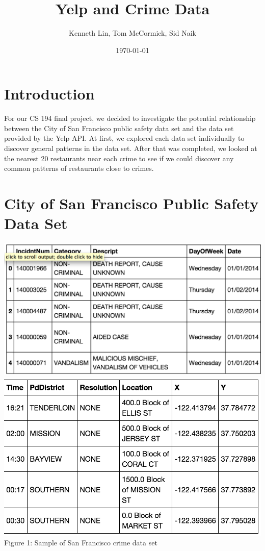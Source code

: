 \documentclass{article}
\title{Yelp and Crime Data}  %
\author{Kenneth Lin, Tom McCormick, Sid Naik}
\date{\today}
\begin{document}
\maketitle

\section{Introduction}

For our CS 194 final project, we decided to investigate the potential
relationship between the City of San Francisco public safety data set and
the data set provided by the Yelp API. At first, we explored each data set
individually to discover general patterns in the data set. After that was
completed, we looked at the nearest 20 restaurants near each crime to see
if we could discover any common patterns of restaurants close to crimes.

\section{City of San Francisco Public Safety Data Set}

\begin{center}
  \includegraphics[scale=0.5]{sf_city_sample_1.png} \\
  \includegraphics[scale=0.5]{sf_city_sample_2.png} \\
  Figure 1: Sample of San Francisco crime data set
\end{center}
\end{document}

